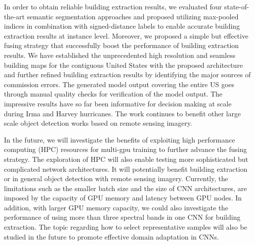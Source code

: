 \documentclass[journal]{IEEEtran}
\begin{document}
In order to obtain reliable building extraction results, we evaluated four state-of-the-art semantic segmentation approaches and proposed utilizing max-pooled indices in combination with signed-distance labels to enable  
accurate building extraction results at instance level. Moreover, we proposed a simple but effective fusing strategy that successfully boost the performance of building extraction results. We have established the unprecedented high resolution and seamless building maps for the contiguous United States with the proposed architecture and further refined building extraction results by identifying the major sources of commission errors. The generated model output covering the entire US goes through manual quality checks for verification of the model output. The impressive results have so far been informative for decision making at scale during Irma and Harvey hurricanes. The work continues to benefit other large scale object detection works based on remote sensing imagery.

In the future, we will investigate the benefits of exploiting high performance computing (HPC) resources for multi-gpu training to further advance the fusing strategy. The exploration of HPC will also enable testing more sophisticated but complicated network architectures. It will potentially benefit building extraction or in general object detection with remote sensing imagery.  Currently, the limitations such as the smaller batch size and the size of CNN architectures, are imposed by the capacity of GPU memory and latency between GPU nodes. In addition, with larger GPU memory capacity, we could also investigate the performance of using more than three spectral bands in one CNN for building extraction.
The topic regarding how to select representative samples will also be studied in the future to promote effective domain adaptation in CNNs.







%
\end{document}
